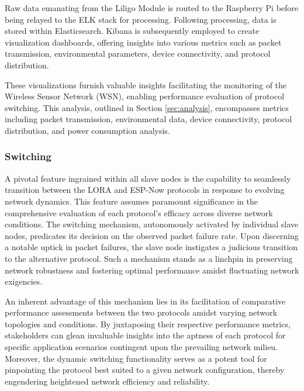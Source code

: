 Raw data emanating from the Liligo Module is routed to the Raspberry Pi before being relayed to the ELK stack for processing. Following processing, data is stored within Elasticsearch. Kibana is subsequently employed to create visualization dashboards, offering insights into various metrics such as packet transmission, environmental parameters, device connectivity, and protocol distribution.

These visualizations furnish valuable insights facilitating the monitoring of the Wireless Sensor Network (WSN), enabling performance evaluation of protocol switching. This analysis, outlined in Section \ref{sec:analysis}, encompasses metrics including packet transmission, environmental data, device connectivity, protocol distribution, and power consumption analysis.

\subsubsection{Switching}\label{sec:switching}

A pivotal feature ingrained within all slave nodes is the capability to seamlessly transition between the LORA and ESP-Now protocols in response to evolving network dynamics. This feature assumes paramount significance in the comprehensive evaluation of each protocol's efficacy across diverse network conditions. The switching mechanism, autonomously activated by individual slave nodes, predicates its decision on the observed packet failure rate. Upon discerning a notable uptick in packet failures, the slave node instigates a judicious transition to the alternative protocol. Such a mechanism stands as a linchpin in preserving network robustness and fostering optimal performance amidst fluctuating network exigencies.

An inherent advantage of this mechanism lies in its facilitation of comparative performance assessments between the two protocols amidst varying network topologies and conditions. By juxtaposing their respective performance metrics, stakeholders can glean invaluable insights into the aptness of each protocol for specific application scenarios contingent upon the prevailing network milieu. Moreover, the dynamic switching functionality serves as a potent tool for pinpointing the protocol best suited to a given network configuration, thereby engendering heightened network efficiency and reliability.


